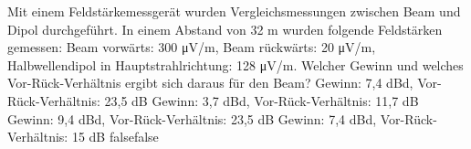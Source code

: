     {Mit einem Feldstärkemessgerät wurden Vergleichsmessungen zwischen Beam und Dipol durchgeführt. In einem Abstand von 32 m wurden folgende Feldstärken gemessen: Beam vorwärts: 300 μV/m, Beam rückwärts: 20 μV/m, Halbwellendipol in Hauptstrahlrichtung: 128 μV/m. Welcher Gewinn und welches Vor-Rück-Verhältnis ergibt sich daraus für den Beam?}
    {Gewinn: 7,4 dBd, Vor-Rück-Verhältnis: 23,5 dB}
    {Gewinn: 3,7 dBd, Vor-Rück-Verhältnis: 11,7 dB}
    {Gewinn: 9,4 dBd, Vor-Rück-Verhältnis: 23,5 dB}
    {Gewinn: 7,4 dBd, Vor-Rück-Verhältnis: 15 dB}
    {false}{false}
